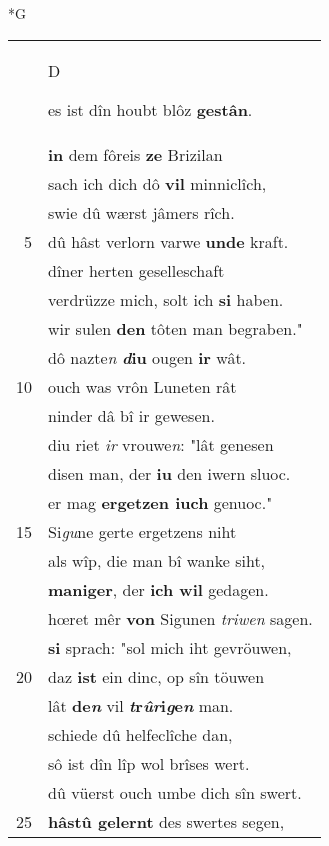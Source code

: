 \documentclass[8pt,a4paper,notitlepage]{article}
\begin{document}
\newpage
\begin{table}[ht]
\begin{minipage}[t]{0.5\linewidth}
\small
\begin{center}*G
\end{center}
\begin{tabular}{rl}
 & \begin{large}D\end{large}es ist dîn houbt blôz \textbf{gestân}.\\ 
 & \textbf{in} dem fôreis \textbf{ze} Brizilan\\ 
 & sach ich dich dô \textbf{vil} minniclîch,\\ 
 & swie dû wærst jâmers rîch.\\ 
5 & dû hâst verlorn varwe \textbf{unde} kraft.\\ 
 & dîner herten geselleschaft\\ 
 & verdrüzze mich, solt ich \textbf{si} haben.\\ 
 & wir sulen \textbf{den} tôten man begraben."\\ 
 & dô nazte\textit{n} \textbf{\textit{d}iu} ougen \textbf{ir} wât.\\ 
10 & ouch was vrôn Luneten rât\\ 
 & ninder dâ bî ir gewesen.\\ 
 & diu riet \textit{ir} vrouwe\textit{n}: "lât genesen\\ 
 & disen man, der \textbf{iu} den iwern sluoc.\\ 
 & er mag \textbf{ergetzen iuch} genuoc."\\ 
15 & Si\textit{gu}ne gerte ergetzens niht\\ 
 & als wîp, die man bî wanke siht,\\ 
 & \textbf{maniger}, der \textbf{ich wil} gedagen.\\ 
 & hœret mêr \textbf{von} Sigunen \textit{triwen} sagen.\\ 
 & \textbf{si} sprach: "sol mich iht gevröuwen,\\ 
20 & daz \textbf{ist} ein dinc, op sîn töuwen\\ 
 & lât \textbf{de\textit{n}} vil \textbf{\textit{t}r\textit{ûr}i\textit{g}e\textit{n}} man.\\ 
 & schiede dû helfeclîche dan,\\ 
 & sô ist dîn lîp wol brîses wert.\\ 
 & dû vüerst ouch umbe dich sîn swert.\\ 
25 & \textbf{hâstû gelernt} des swertes segen,\\ 

\end{tabular}
\end{minipage}
\end{table}
\end{document}
